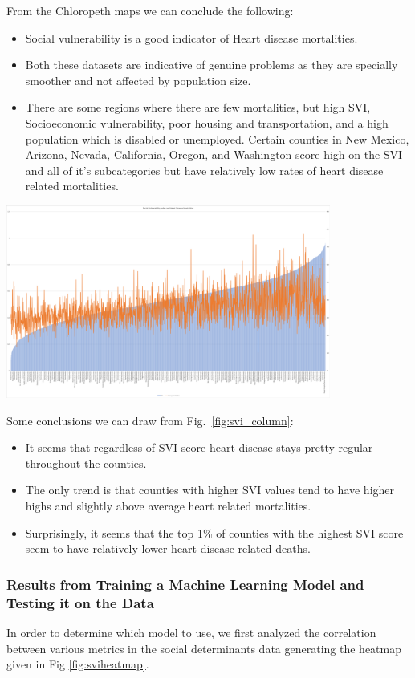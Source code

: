 \documentclass[journal,12pt,onecolumn]{IEEEtran}
\begin{document}
From the Chloropeth maps we can conclude the following:
\begin{itemize}
\item Social vulnerability is a good indicator of Heart disease mortalities.
\item Both these datasets are indicative of genuine problems as they are specially smoother and not affected by population size.
\item There are some regions where there are few mortalities, but high SVI, Socioeconomic vulnerability, poor housing and transportation, and a high population which is disabled or unemployed. Certain counties in New Mexico, Arizona, Nevada, California, Oregon, and Washington score high on the SVI and all of it's subcategories but have relatively low rates of heart disease related mortalities.
\end{itemize}

\begin{center}
\centering
\includegraphics[width=0.8\textwidth]{figures/svi_column.PNG}
\label{fig:svi_column}
\end{center}

Some conclusions we can draw from Fig.~\ref{fig:svi_column}:
\begin{itemize}
\item It seems that regardless of SVI score heart disease stays pretty regular throughout the counties.
\item The only trend is that counties with higher SVI values tend to have higher highs and slightly above average heart related mortalities.
\item Surprisingly, it seems that the top 1\% of counties with the highest SVI score seem to have relatively lower heart disease related deaths.
\end{itemize}

\subsubsection{Results from Training a Machine Learning Model and Testing it on the Data}
In order to determine which model to use, we first analyzed the correlation between various metrics in the social determinants data generating the heatmap given in Fig \ref{fig:sviheatmap}.
\end{document}

